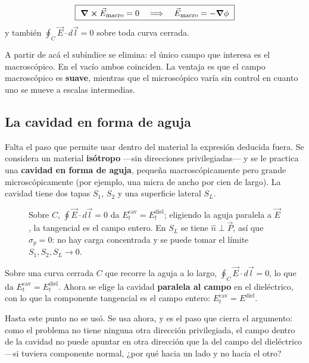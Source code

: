 \documentclass[12pt,a4paper]{article}
\begin{document}
\begin{keybox}
\[
\boxed{\ \curl \vec E_{\text{macro}} = 0
\quad\Longrightarrow\quad
\vec E_{\text{macro}} = -\grad \phi \ }
\]
y también $\oint_C \vec E \cdot d\vec l = 0$ sobre toda curva cerrada.
\end{keybox}

A partir de acá el subíndice se elimina: el único campo que interesa es el
macroscópico. En el vacío ambos coinciden. La ventaja es que el campo
macroscópico es \textbf{suave}, mientras que el microscópico varía sin control en
cuanto uno se mueve a escalas intermedias.

\subsection{La cavidad en forma de aguja}

Falta el paso que permite usar dentro del material la expresión deducida fuera.
Se considera un material \textbf{isótropo} ---sin direcciones privilegiadas--- y
se le practica una \textbf{cavidad en forma de aguja}, pequeña macroscópicamente
pero grande microscópicamente (por ejemplo, una micra de ancho por cien de
largo). La cavidad tiene dos tapas $S_1$, $S_2$ y una superficie lateral $S_L$.

\begin{figure}[H]
  \centering
  
  \caption{Sobre $C$, $\oint \vec E\cdot d\vec l = 0$ da
  $E^{\text{cav}}_t = E^{\text{diel}}_t$; eligiendo la aguja paralela a $\vec E$,
  la tangencial es el campo entero. En $S_L$ se tiene $\hat n \perp \vec P$, así
  que $\sigma_p = 0$: no hay carga concentrada y se puede tomar el límite
  $S_1, S_2, S_L \to 0$.}
\end{figure}

Sobre una curva cerrada $C$ que recorre la aguja a lo largo,
$\oint_C \vec E \cdot d\vec l = 0$, lo que da
$E^{\text{cav}}_t = E^{\text{diel}}_t$. Ahora se elige la cavidad
\textbf{paralela al campo} en el dieléctrico, con lo que la componente tangencial
es el campo entero: $E^{\text{cav}}_t = E^{\text{diel}}$.

\begin{warnbox}
Hasta este punto no se usó. Se usa ahora, y es el paso que cierra el argumento:
como el problema no tiene ninguna otra dirección privilegiada, el campo dentro de
la cavidad no puede apuntar en otra dirección que la del campo del dieléctrico
---si tuviera componente normal, ¿por qué hacia un lado y no hacia el otro?
\end{warnbox}
\end{document}
